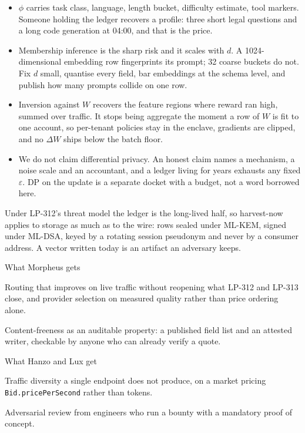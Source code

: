 \documentclass[10pt,a4paper]{article}
\newcommand{\code}[1]{\texttt{\small #1}}
\begin{document}
\begin{itemize}
\item $\phi$ carries task class, language, length bucket, difficulty estimate, tool markers.
Someone holding the ledger recovers a profile: three short legal questions and a long code
generation at 04:00, and that is the price.
\item Membership inference is the sharp risk and it scales with $d$. A 1024-dimensional
embedding row fingerprints its prompt; 32 coarse buckets do not. Fix $d$ small, quantise every
field, bar embeddings at the schema level, and publish how many prompts collide on one row.
\item Inversion against $W$ recovers the feature regions where reward ran high, summed over
traffic. It stops being aggregate the moment a row of $W$ is fit to one account, so per-tenant
policies stay in the enclave, gradients are clipped, and no $\Delta W$ ships below the batch
floor.
\item We do not claim differential privacy. An honest claim names a mechanism, a noise scale
and an accountant, and a ledger living for years exhausts any fixed $\varepsilon$. DP on the
update is a separate docket with a budget, not a word borrowed here.
\end{itemize}

Under LP-312's threat model the ledger is the long-lived half, so harvest-now applies to
storage as much as to the wire: rows sealed under ML-KEM, signed under ML-DSA, keyed by a rotating session pseudonym
and never by a consumer address. A vector written today is an artifact an adversary keeps.

\begin{stake}{What Morpheus gets}
\item Routing that improves on live traffic without reopening what LP-312 and LP-313 close, and
provider selection on measured quality rather than price ordering alone.
\item Content-freeness as an auditable property: a published field list and an attested writer,
checkable by anyone who can already verify a quote.
\end{stake}

\begin{stake}{What Hanzo and Lux get}
\item Traffic diversity a single endpoint does not produce, on a market pricing
\code{Bid.pricePerSecond} rather than tokens.
\item Adversarial review from engineers who run a bounty with a mandatory proof of concept.
\end{stake}
\end{document}
